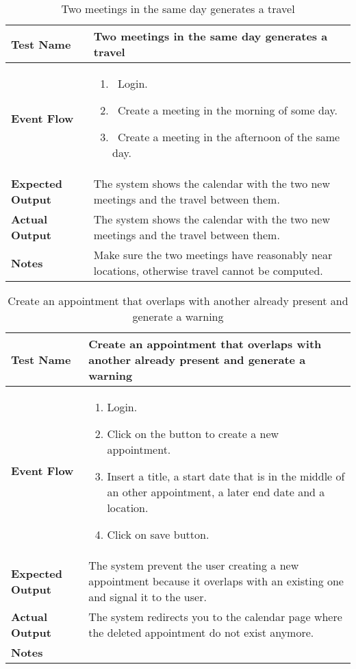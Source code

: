 \begin{table}[h]	
\centering
\def\arraystretch{1.5}
\begin{tabular}{|m{7cm}|m{7cm}|}
	\hline
	\textbf{Test Name}            &  Two meetings in the same day generates a travel  \\ \hline
	\textbf{Event Flow}             & 
		\begin{enumerate}
			\item~Login.
			\item~Create a meeting in the morning of some day.
			\item~Create a meeting in the afternoon of the same day.
		\end{enumerate}
	  \\ \hline
	\textbf{Expected Output}  &   The system shows the calendar with the two new meetings and the travel between them.  \\ \hline
	\textbf{Actual Output}       &  The system shows the calendar with the two new meetings and the travel between them.   \\ \hline
	\textbf{Notes} &  Make sure the two meetings have reasonably near locations, otherwise travel cannot be computed.  \\ \hline
\end{tabular}
\caption{Two meetings in the same day generates a travel}
\end{table}


\begin{table}[h]	
	\centering
	\def\arraystretch{1.5}
	\begin{tabular}{|m{7cm}|m{7cm}|}
		\hline
		\textbf{Test Name}            & Create an appointment that overlaps with another already present and generate a warning  \\ \hline
		\textbf{Event Flow}             & 
		\begin{enumerate}
			\item Login.
			\item Click on the button to create a new appointment.
			\item Insert a title, a start date that is in the middle of an other appointment, a later end date and a location.
			\item Click on save button.
		\end{enumerate} \\ \hline
		\textbf{Expected Output}  &  The system prevent the user creating a new appointment because it overlaps with an existing one and signal it to the user.  \\ \hline
		\textbf{Actual Output}       & The system redirects you to the calendar page where the deleted appointment do not exist anymore.    \\ \hline
		\textbf{Notes} & \\ \hline
	\end{tabular}
	\caption{ Create an appointment that overlaps with another already present and generate a warning }
\end{table}


